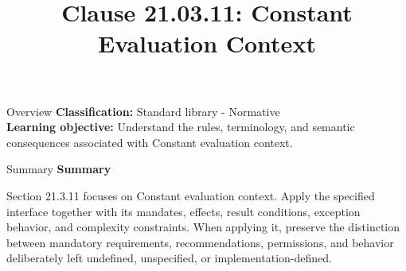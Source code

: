 \documentclass[10pt,letterpaper]{article}
\title{Clause 21.03.11: Constant Evaluation Context}
\author{}
\date{}
\begin{document}
\maketitle
\begin{CornellOverviewBox}{Overview}
\textbf{Classification:} Standard library - Normative\\[2pt]
\textbf{Learning objective:} Understand the rules, terminology, and semantic consequences associated with Constant evaluation context.
\end{CornellOverviewBox}\begin{CornellSummaryBox}{Summary}
{\sffamily\bfseries\color{Accent} Summary}\par\vspace{3pt}Section 21.3.11 focuses on Constant evaluation context. Apply the specified interface together with its mandates, effects, result conditions, exception behavior, and complexity constraints. When applying it, preserve the distinction between mandatory requirements, recommendations, permissions, and behavior deliberately left undefined, unspecified, or implementation-defined.
\end{CornellSummaryBox}
\end{document}
